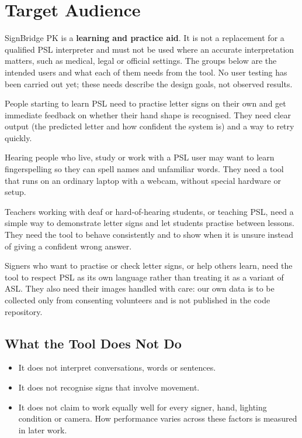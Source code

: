\section{Target Audience}
\label{sec:audience}

SignBridge PK is a \textbf{learning and practice aid}. It is not a replacement for a qualified PSL interpreter and must not be used where an accurate interpretation matters, such as medical, legal or official settings. The groups below are the intended users and what each of them needs from the tool. No user testing has been carried out yet; these needs describe the design goals, not observed results.

\begin{description}[style=nextline, leftmargin=1.5em]
  \item[Learners of PSL]
    People starting to learn PSL need to practise letter signs on their own and get immediate feedback on whether their hand shape is recognised. They need clear output (the predicted letter and how confident the system is) and a way to retry quickly.

  \item[Family members and classmates of PSL users]
    Hearing people who live, study or work with a PSL user may want to learn fingerspelling so they can spell names and unfamiliar words. They need a tool that runs on an ordinary laptop with a webcam, without special hardware or setup.

  \item[Teachers]
    Teachers working with deaf or hard-of-hearing students, or teaching PSL, need a simple way to demonstrate letter signs and let students practise between lessons. They need the tool to behave consistently and to show when it is unsure instead of giving a confident wrong answer.

  \item[The PSL community]
    Signers who want to practise or check letter signs, or help others learn, need the tool to respect PSL as its own language rather than treating it as a variant of ASL. They also need their images handled with care: our own data is to be collected only from consenting volunteers and is not published in the code repository.
\end{description}

\subsection{What the Tool Does Not Do}

\begin{itemize}
  \item It does not interpret conversations, words or sentences.
  \item It does not recognise signs that involve movement.
  \item It does not claim to work equally well for every signer, hand, lighting condition or camera. How performance varies across these factors is measured in later work.
\end{itemize}
